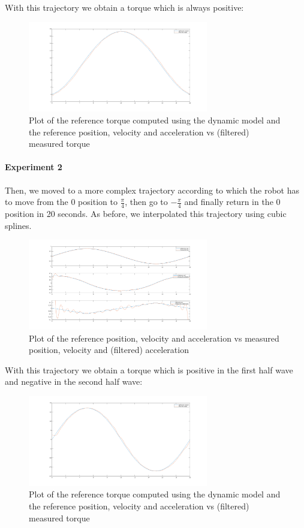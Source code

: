 \documentclass{article}
\begin{document}
\noindent With this trajectory we obtain a torque which is always positive:

\begin{figure}[!htbp]
\centering
\includegraphics[width=0.7\textwidth]{images/1-dof/new_experiment1.png}
\caption{Plot of the reference torque computed using the dynamic model and the reference position, velocity and acceleration vs (filtered) measured torque}
\end{figure}
\pagebreak
\paragraph{Experiment 2}Then, we moved to a more complex trajectory according to which the robot has to move from the 0 position to $\frac{\pi}{4}$, then go to $-\frac{\pi}{4}$ and finally return in the 0 position in 20 seconds. As before, we interpolated this trajectory using cubic splines.
\begin{figure}[!htbp]
\centering
\includegraphics[width=0.7\textwidth]{images/1-dof/new_experiment2_traj.png}
\caption{Plot of the reference position, velocity and acceleration vs measured position, velocity and (filtered) acceleration}
\end{figure}
\FloatBarrier

\noindent With this trajectory we obtain a torque which is positive in the first half wave and negative in the second half wave:

\begin{figure}[!htbp]
\centering
\includegraphics[width=0.7\textwidth]{images/1-dof/new_experiment2.png}
\caption{Plot of the reference torque computed using the dynamic model and the reference position, velocity and acceleration vs (filtered) measured torque}
\end{figure}
\pagebreak
\end{document}
